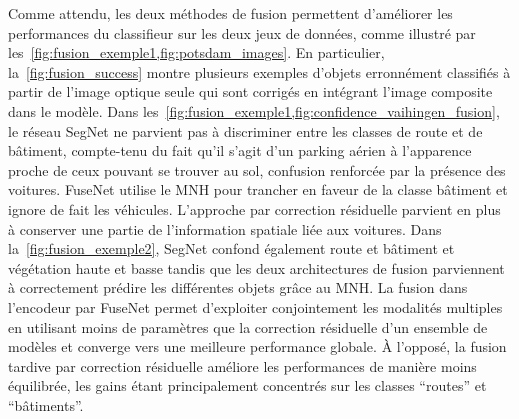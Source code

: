 Comme attendu, les deux méthodes de fusion permettent d'améliorer les performances du classifieur sur les deux jeux de données, comme illustré par les~\cref{fig:fusion_exemple1,fig:potsdam_images}. En particulier, la~\cref{fig:fusion_success} montre plusieurs exemples d'objets erronnément classifiés à partir de l'image optique seule qui sont corrigés en intégrant l'image composite dans le modèle. Dans les~\cref{fig:fusion_exemple1,fig:confidence_vaihingen_fusion}, le réseau SegNet ne parvient pas à discriminer entre les classes de route et de bâtiment, compte-tenu du fait qu'il s'agit d'un parking aérien à l'apparence proche de ceux pouvant se trouver au sol, confusion renforcée par la présence des voitures. FuseNet utilise le \gls{MNH} pour trancher en faveur de la classe bâtiment et ignore de fait les véhicules. L'approche par correction résiduelle parvient en plus à conserver une partie de l'information spatiale liée aux voitures. Dans la~\cref{fig:fusion_exemple2}, SegNet confond également route et bâtiment et végétation haute et basse tandis que les deux architectures de fusion parviennent à correctement prédire les différentes objets grâce au \gls{MNH}.
La fusion dans l'encodeur par FuseNet permet d'exploiter conjointement les modalités multiples en utilisant moins de paramètres que la correction résiduelle d'un ensemble de modèles et converge vers une meilleure performance globale. À l'opposé, la fusion tardive par correction résiduelle améliore les performances de manière moins équilibrée, les gains étant principalement concentrés sur les classes ``routes'' et ``bâtiments''.


